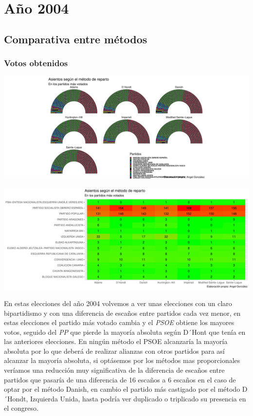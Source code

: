 \documentclass[12pt,a4paper,]{book}
\numberwithin{dummy}{section}
\theoremstyle{ocrenumbox}
\theoremstyle{blacknumex}
\theoremstyle{blacknumbox}
\theoremstyle{ocrenum}
\theoremstyle{ocrenum}
\begin{document}
\hypertarget{auxf1o-2004}{%
\section{Año 2004}\label{auxf1o-2004}}

\hypertarget{comparativa-entre-muxe9todos-8}{%
\subsection{Comparativa entre
métodos}\label{comparativa-entre-muxe9todos-8}}

\hypertarget{votos-obtenidos-8}{%
\subsubsection{Votos obtenidos}\label{votos-obtenidos-8}}

\begin{center}\includegraphics[width=0.95\linewidth]{figurasR/unnamed-chunk-83-1} \end{center}

\begin{center}\includegraphics[width=0.95\linewidth]{figurasR/unnamed-chunk-83-2} \end{center}

En estas elecciones del año 2004 volvemos a ver unas elecciones con un
claro bipartidismo y con una diferencia de escaños entre partidos cada
vez menor, en estas elecciones el partido más votado cambia y el
\emph{PSOE} obtiene los mayores votos, seguido del \emph{PP} que pierde
la mayoría absoluta según D´Hont que tenía en las anteriores elecciones.
En ningún método el PSOE alcanzaría la mayoría absoluta por lo que
deberá de realizar alianzas con otros partidos para así alcanzar la
mayoría absoluta, si optásemos por los métodos mas proporcionales
veríamos una reducción muy significativa de la diferencia de escaños
entre partidos que pasaría de una diferencia de 16 escaños a 6 escaños
en el caso de optar por el método Danish, en cambio el partido más
castigado por el método D´Hondt, Izquierda Unida, hasta podría ver
duplicado o triplicado su presencia en el congreso.
\end{document}
